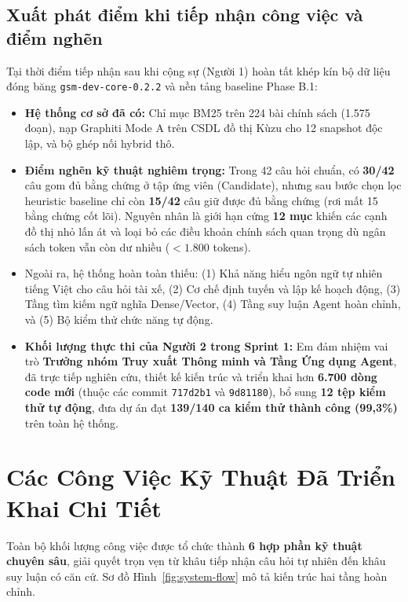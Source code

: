 \documentclass[a4paper,11pt]{article}
\begin{document}
\subsection{Xuất phát điểm khi tiếp nhận công việc và điểm nghẽn}
Tại thời điểm tiếp nhận sau khi cộng sự (Người 1) hoàn tất khép kín bộ dữ liệu đóng băng \texttt{gsm-dev-core-0.2.2} và nền tảng baseline Phase B.1:
\begin{itemize}[noitemsep,topsep=2pt]
    \item \textbf{Hệ thống cơ sở đã có:} Chỉ mục BM25 trên 224 bài chính sách (1.575 đoạn), nạp Graphiti Mode A trên CSDL đồ thị Kùzu cho 12 snapshot độc lập, và bộ ghép nối hybrid thô.
    \item \textbf{Điểm nghẽn kỹ thuật nghiêm trọng:} Trong 42 câu hỏi chuẩn, có \textbf{30/42} câu gom đủ bằng chứng ở tập ứng viên (Candidate), nhưng sau bước chọn lọc heuristic baseline chỉ còn \textbf{15/42} câu giữ được đủ bằng chứng (rơi mất 15 bằng chứng cốt lõi). Nguyên nhân là giới hạn cứng \textbf{12 mục} khiến các cạnh đồ thị nhỏ lấn át và loại bỏ các điều khoản chính sách quan trọng dù ngân sách token vẫn còn dư nhiều ($< 1.800$ tokens).
    \item Ngoài ra, hệ thống hoàn toàn thiếu: (1) Khả năng hiểu ngôn ngữ tự nhiên tiếng Việt cho câu hỏi tài xế, (2) Cơ chế định tuyến và lập kế hoạch động, (3) Tầng tìm kiếm ngữ nghĩa Dense/Vector, (4) Tầng suy luận Agent hoàn chỉnh, và (5) Bộ kiểm thử chức năng tự động.
    \item \textbf{Khối lượng thực thi của Người 2 trong Sprint 1:} Em đảm nhiệm vai trò \textbf{Trưởng nhóm Truy xuất Thông minh và Tầng Ứng dụng Agent}, đã trực tiếp nghiên cứu, thiết kế kiến trúc và triển khai hơn \textbf{6.700 dòng code mới} (thuộc các commit \texttt{717d2b1} và \texttt{9d81180}), bổ sung \textbf{12 tệp kiểm thử tự động}, đưa dự án đạt \textbf{139/140 ca kiểm thử thành công (99,3\%)} trên toàn hệ thống.
\end{itemize}

\section{Các Công Việc Kỹ Thuật Đã Triển Khai Chi Tiết}

Toàn bộ khối lượng công việc được tổ chức thành \textbf{6 hợp phần kỹ thuật chuyên sâu}, giải quyết trọn vẹn từ khâu tiếp nhận câu hỏi tự nhiên đến khâu suy luận có căn cứ. Sơ đồ Hình~\ref{fig:system-flow} mô tả kiến trúc hai tầng hoàn chỉnh.
\end{document}
